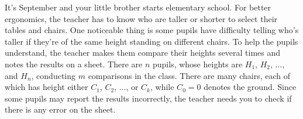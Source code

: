 It's September and your little brother starts elementary school.
For better ergonomics, the teacher has to know who are taller or shorter to select their tables and chairs.
One noticeable thing is some pupils have difficulty telling who's taller if they're of the same height standing on different chairs.
To help the pupils understand, the teacher makes them compare their heights several times and notes the results on a sheet.
There are $n$ pupils, whose heights are $H_1$, $H_2$, $\ldots$, and $H_n$, conducting $m$ comparisons in the class.
There are many chairs, each of which has height either $C_1$, $C_2$, $\ldots$, or $C_k$, while $C_0 = 0$ denotes the ground.
Since some pupils may report the results incorrectly, the teacher needs you to check if there is any error on the sheet.

